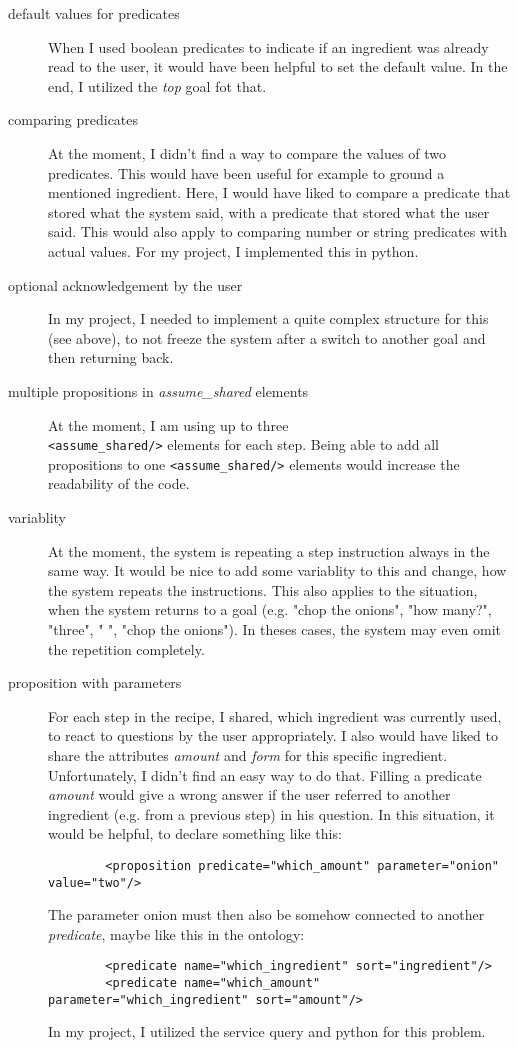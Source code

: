 \documentclass[
	11pt, %
]{fphw}
\begin{document}
\begin{description}
    \item [default values for predicates] When I used boolean predicates to indicate if an ingredient was already read to the user, it would have been helpful to set the default value. In the end, I utilized the \emph{top} goal fot that.
    \item [comparing predicates] At the moment, I didn't find a way to compare the values of two predicates. This would have been useful for example to ground a mentioned ingredient. Here, I would have liked to compare a predicate that stored what the system said, with a predicate that stored what the user said. This would also apply to comparing number or string predicates with actual values. For my project, I implemented this in python.
    \item [optional acknowledgement by the user] In my project, I needed to implement a quite complex structure for this (see above), to not freeze the system after a switch to another goal and then returning back. 
    \item [multiple propositions in \emph{assume\_shared} elements] At the moment, I am using up to three \\ \texttt{<assume_shared/>} elements for each step. Being able to add all propositions to one \texttt{<assume_shared/>} elements would increase the readability of the code.
    \item [variablity] At the moment, the system is repeating a step instruction always in the same way. It would be nice to add some variablity to this and change, how the system repeats the instructions. This also applies to the situation, when the system returns to a goal (e.g. "chop the onions", "how many?", "three", " ", "chop the onions"). In theses cases, the system may even omit the repetition completely.
    \item [proposition with parameters] For each step in the recipe, I shared, which ingredient was currently used, to react to questions by the user appropriately. I also would have liked to share the attributes \emph{amount} and \emph{form} for this specific ingredient. Unfortunately, I didn't find an easy way to do that. Filling a predicate \emph{amount} would give a wrong answer if the user referred to another ingredient (e.g. from a previous step) in his question. In this situation, it would be helpful, to declare something like this:
    \begin{verbatim}
        <proposition predicate="which_amount" parameter="onion" value="two"/>
    \end{verbatim}
    The parameter onion must then also be somehow connected to another \emph{predicate}, maybe like this in the ontology:
    \begin{verbatim}
        <predicate name="which_ingredient" sort="ingredient"/>
        <predicate name="which_amount" parameter="which_ingredient" sort="amount"/>
    \end{verbatim}

    In my project, I utilized the service query and python for this problem.
\end{description}
\end{document}
